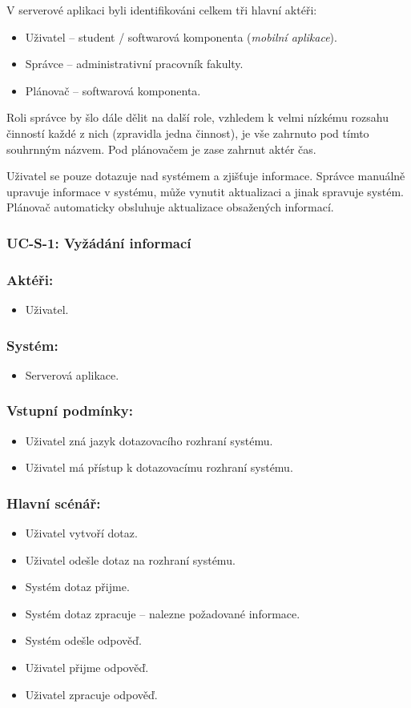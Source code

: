 V serverové aplikaci byli identifikováni celkem tři hlavní aktéři:
\begin{itemize}
 \item Uživatel -- student / softwarová komponenta (\textit{mobilní aplikace}).
 \item Správce -- administrativní pracovník fakulty.
 \item Plánovač -- softwarová komponenta.
\end{itemize}
Roli správce by šlo dále dělit na další role, vzhledem k velmi nízkému rozsahu činností každé z nich (zpravidla jedna činnost), je vše zahrnuto pod tímto souhrnným názvem. Pod plánovačem je zase zahrnut aktér čas.

Uživatel se pouze dotazuje nad systémem a zjišťuje informace. Správce manuálně upravuje informace v systému, může vynutit aktualizaci a jinak spravuje systém. Plánovač automaticky obsluhuje aktualizace obsažených informací.

\subsubsection{UC-S-1: Vyžádání informací}
\subsubsection*{Aktéři:}
\begin{itemize}
 \item Uživatel.
\end{itemize}
\subsubsection*{Systém:}
\begin{itemize}
 \item Serverová aplikace.
\end{itemize}
\subsubsection*{Vstupní podmínky:}
\begin{itemize}
 \item Uživatel zná jazyk dotazovacího rozhraní systému.
 \item Uživatel má přístup k dotazovacímu rozhraní systému.
\end{itemize}
\subsubsection*{Hlavní scénář:}
\begin{itemize}
 \item Uživatel vytvoří dotaz.
 \item Uživatel odešle dotaz na rozhraní systému.
 \item Systém dotaz přijme.
 \item Systém dotaz zpracuje -- nalezne požadované informace.
 \item Systém odešle odpověď.
 \item Uživatel přijme odpověď.
 \item Uživatel zpracuje odpověď.
\end{itemize}
